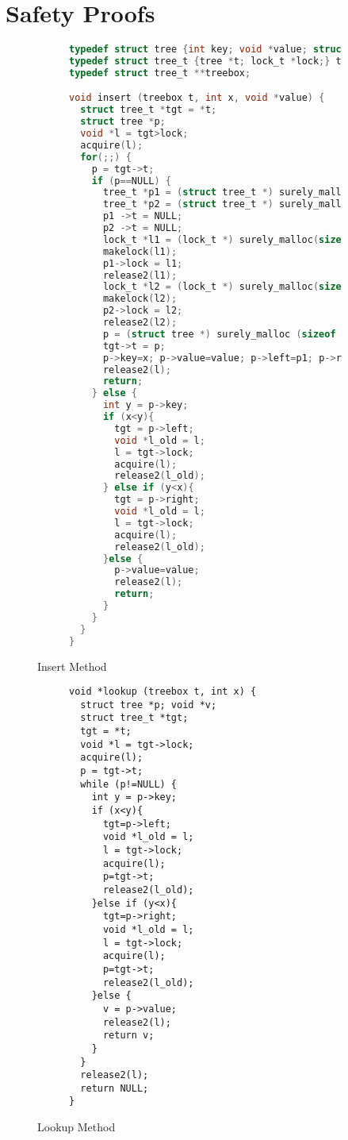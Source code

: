 \documentclass[acmsmall,screen]{acmart}\settopmatter{printfolios=true}
\begin{document}
\section{Safety Proofs}
\begin{figure}[htp]
\begin{subfigure}[t]{\textwidth}
\begin{lstlisting}[language = C]
typedef struct tree {int key; void *value; struct tree_t *left, *right;} tree;
typedef struct tree_t {tree *t; lock_t *lock;} tree_t;
typedef struct tree_t **treebox;

void insert (treebox t, int x, void *value) {
  struct tree_t *tgt = *t;
  struct tree *p;
  void *l = tgt>lock;
  acquire(l);
  for(;;) {
    p = tgt->t;
    if (p==NULL) {
      tree_t *p1 = (struct tree_t *) surely_malloc (sizeof *tgt);
      tree_t *p2 = (struct tree_t *) surely_malloc (sizeof *tgt);
      p1 ->t = NULL;
      p2 ->t = NULL;
      lock_t *l1 = (lock_t *) surely_malloc(sizeof(lock_t));
      makelock(l1);
      p1->lock = l1;
      release2(l1);
      lock_t *l2 = (lock_t *) surely_malloc(sizeof(lock_t));
      makelock(l2);
      p2->lock = l2;
      release2(l2);
      p = (struct tree *) surely_malloc (sizeof *p);
      tgt->t = p;
      p->key=x; p->value=value; p->left=p1; p->right=p2;
      release2(l);
      return;
    } else {
      int y = p->key;
      if (x<y){
      	tgt = p->left;
        void *l_old = l;
        l = tgt->lock;
        acquire(l);
        release2(l_old);
      } else if (y<x){
        tgt = p->right;
        void *l_old = l;
        l = tgt->lock;
        acquire(l);
        release2(l_old);
      }else {
      	p->value=value;
        release2(l);
      	return;
      }
    }
  }
} 
\end{lstlisting} 
\end{subfigure}
\caption{Insert Method}
\label{insert}
\end{figure}     
\begin{figure}[htp]
\begin{subfigure}[t]{\textwidth}
 \begin{lstlisting}
void *lookup (treebox t, int x) {
  struct tree *p; void *v;
  struct tree_t *tgt;
  tgt = *t;
  void *l = tgt->lock;
  acquire(l);
  p = tgt->t;
  while (p!=NULL) {
    int y = p->key;
    if (x<y){
      tgt=p->left;
      void *l_old = l;
      l = tgt->lock;
      acquire(l);
      p=tgt->t;
      release2(l_old);
    }else if (y<x){
      tgt=p->right;
      void *l_old = l;
      l = tgt->lock;
      acquire(l);
      p=tgt->t;
      release2(l_old);
    }else {
      v = p->value;
      release2(l);
      return v;
    }
  }
  release2(l);
  return NULL;
}
\end{lstlisting}
\end{subfigure}
\caption{Lookup Method}
\label{lookup}
\end{figure}
\end{document}

